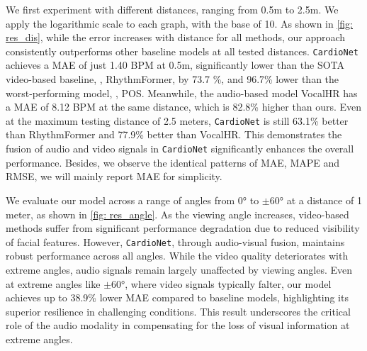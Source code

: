 We first experiment with different distances, ranging from 0.5m to 2.5m. We apply the logarithmic scale to each graph, with the base of 10. 
As shown in \fig\ref{fig: res_dis},
while the error increases with distance for all methods, our approach consistently outperforms other baseline models at all tested distances. \texttt{CardioNet} achieves a MAE of just 1.40 BPM at 0.5m, significantly lower than the SOTA video-based baseline, \ie, RhythmFormer, by 73.7 \%, and 96.7\% lower than the worst-performing model, \ie, POS. Meanwhile, the audio-based model VocalHR has a MAE of 8.12 BPM at the same distance, which is 82.8\% higher than ours. 
Even at the maximum testing distance of 2.5 meters, \texttt{CardioNet} is still 63.1\% better than RhythmFormer and 77.9\% better than VocalHR. This demonstrates the fusion of audio and video signals in \texttt{CardioNet} significantly enhances the overall performance. Besides, we observe the identical patterns of MAE, MAPE and RMSE, we will mainly report MAE for simplicity.


We evaluate our model across a range of angles from 0° to $\pm$60° at a distance of 1 meter, as shown in \fig\ref{fig: res_angle}. As the viewing angle increases, video-based methods suffer from significant performance degradation due to reduced visibility of facial features. However, \texttt{CardioNet}, through audio-visual fusion, maintains robust performance across all angles. While the video quality deteriorates with extreme angles, audio signals remain largely unaffected by viewing angles. Even at extreme angles like $\pm$60°, where video signals typically falter, our model achieves up to 38.9\% lower MAE compared to baseline models, highlighting its superior resilience in challenging conditions. This result underscores the critical role of the audio modality in compensating for the loss of visual information at extreme angles.


